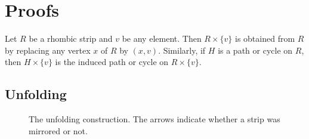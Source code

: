 \documentclass[fontsize=11pt,a4paper,DIV=12]{scrartcl}
\begin{document}


\section{Proofs}\label{sec:proofs}

Let $R$ be a rhombic strip and $v$ be any element. Then $R\times\{v\}$ is obtained from $R$ by replacing any vertex $x$ of $R$ by $(x,v)$. Similarly, if $H$ is a path or cycle on $R$, then $H\times\{v\}$ is the induced path or cycle on $R\times\{v\}$.

\subsection{Unfolding}

\begin{figure}[!ht]
    \centering
    
    \caption{The unfolding construction. The arrows indicate whether a strip was mirrored or not.}
    \label{fig:unfolding}
\end{figure}
\end{document}
